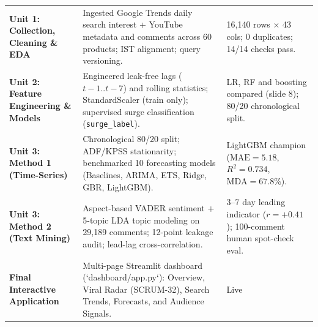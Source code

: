 \documentclass[aspectratio=169, 10pt]{beamer}
\begin{document}
\begin{frame}[t]
\begin{table}[h]
\begin{tabular}{p{2.3cm}p{7.2cm}p{3.5cm}}
                \textbf{Unit 1: Collection, Cleaning \& EDA} & Ingested Google Trends daily search interest + YouTube metadata and comments across 60 products; IST alignment; query versioning. & 16,140 rows $\times$ 43 cols; 0 duplicates; 14/14 checks pass. \\                                                                                                                        
                \addlinespace[2pt]                                                                                                                                                                     
                \textbf{Unit 2: Feature Engineering \& Models} & Engineered leak-free lags ($t-1..t-7$) and rolling statistics; StandardScaler (train only); supervised surge classification (\texttt{surge\_label}).
  & LR, RF and boosting compared (slide 8); 80/20 chronological split. \\                                                                                                           
                \addlinespace[2pt]                                                                                                                                                                     
                \textbf{Unit 3: Method 1 (Time-Series)} & Chronological 80/20 split; ADF/KPSS stationarity; benchmarked 10 forecasting models (Baselines, ARIMA, ETS, Ridge, GBR, LightGBM). & LightGBM
  champion ($\text{MAE}=5.18$, $R^2=0.734$, $\text{MDA}=67.8\%$). \\                                                                                                                                   
                \addlinespace[2pt]                                                                                                                                                                     
                \textbf{Unit 3: Method 2 (Text Mining)} & Aspect-based VADER sentiment + 5-topic LDA topic modeling on 29,189 comments; 12-point leakage audit; lead-lag cross-correlation. & 3--7 day 
  leading indicator ($r=+0.41$); 100-comment human spot-check eval. \\                                                                                                                                 
                \addlinespace[2pt]                                                                                                                                                                     
                \textbf{Final Interactive Application} & Multi-page Streamlit dashboard (`dashboard/app.py`): Overview, Viral Radar (SCRUM-32), Search Trends, Forecasts, and Audience Signals. & Live 

\end{tabular}
\end{table}
\end{frame}
\end{document}

